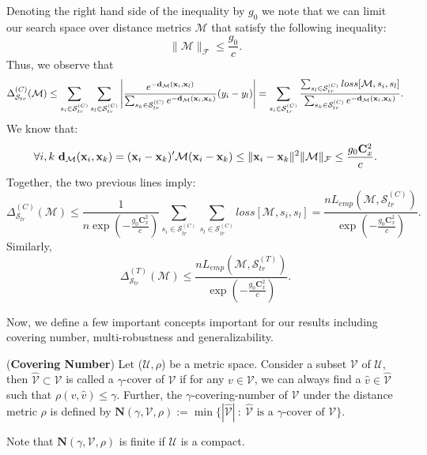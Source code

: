 Denoting the right hand side of the inequality by $g_0$ we note that we can limit our search space over distance metrics $\mathcal{M}$ that satisfy the following inequality:
\begin{equation}
    \|\mathcal{M}\|_\mathcal{F} \leq \frac{g_0}{c}.
\end{equation}
Thus, we observe that 
\begin{equation*}
    \Delta^{(C)}_{\mathcal{S}_{tr}}(\mathcal{M}) \leq \sum_{s_i\in\mathcal{S}^{(C)}_{tr}}\sum_{s_l \in \mathcal{S}^{(C)}_{tr}}\left| \frac{e^{-\mathbf{d}_\mathcal{M}(\mathbf{x}_i,\mathbf{x}_l)}}{\sum_{s_k \in \mathcal{S}^{(C)}_{tr}} e^{-\mathbf{d}_\mathcal{M}(\mathbf{x}_i,\mathbf{x}_k)}}(y_i-y_l)  \right| = \sum_{s_i\in\mathcal{S}^{(C)}_{tr}} \frac{\sum_{s_l \in \mathcal{S}^{(C)}_{tr}}loss[\mathcal{M},s_i,s_l]}{\sum_{s_k \in \mathcal{S}^{(C)}_{tr}} e^{-\mathbf{d}_\mathcal{M}(\mathbf{x}_i,\mathbf{x}_k)}}.
\end{equation*}
We know that:
\begin{equation*}
    \forall i,k ~ \mathbf{d}_\mathcal{M}(\mathbf{x}_i,\mathbf{x}_k) = (\mathbf{x}_i - \mathbf{x}_k)'\mathcal{M}(\mathbf{x}_i - \mathbf{x}_k) \leq \|\mathbf{x}_i - \mathbf{x}_k\|^2 \|\mathcal{M}\|_{\mathcal{F}} \leq \frac{g_0\mathbf{C}_x^2}{c}.
\end{equation*}
Together, the two previous lines imply:
\begin{equation}
\Delta^{(C)}_{\mathcal{S}_{tr}}(\mathcal{M}) 
\leq \frac{1}{n \exp{(-\frac{g_0\mathbf{C}_x^2}{c})}}\sum_{s_i\in\mathcal{S}^{(C)}_{tr}} \sum_{s_l \in \mathcal{S}^{(C)}_{tr}} loss[\mathcal{M},s_i,s_l] = \frac{n L_{emp}(\mathcal{M},\mathcal{S}^{(C)}_{tr})}{\exp{(-\frac{g_0\mathbf{C}_x^2}{c})}}.
\end{equation}
Similarly, 
\begin{equation}
\Delta^{(T)}_{\mathcal{S}_{tr}}(\mathcal{M}) \leq \frac{n L_{emp}(\mathcal{M},\mathcal{S}^{(T)}_{tr})}{\exp{(-\frac{g_0\mathbf{C}_x^2}{c})}}.
\end{equation}

Now, we define a few important concepts important for our results including covering number, multi-robustness and generalizability.
\begin{define}
(\textbf{Covering Number})
Let ($\mathcal{U},\rho$) be a metric space. Consider a subset $\mathcal{V}$ of $\mathcal{U}$, then $\hat{\mathcal{V}} \subset \mathcal{V}$ is called a $\gamma$-cover of $\mathcal{V}$ if for any $v \in \mathcal{V}$, we can always find a $\hat{v}\in\hat{\mathcal{V}}$ such that $\rho(v,\hat{v})\leq\gamma$. Further, the $\gamma$-covering-number of $\mathcal{V}$ under the distance metric $\rho$ is defined by
$\mathbf{N}(\gamma,\mathcal{V},\rho) := \min\big\{ |\hat{\mathcal{V}}| ~:~ \hat{\mathcal{V}} \text{ is a }\gamma\text{-cover of }\mathcal{V} \big\}$.
\end{define}
Note that $\mathbf{N}(\gamma,\mathcal{V},\rho)$ is finite if $\mathcal{U}$ is a compact.

